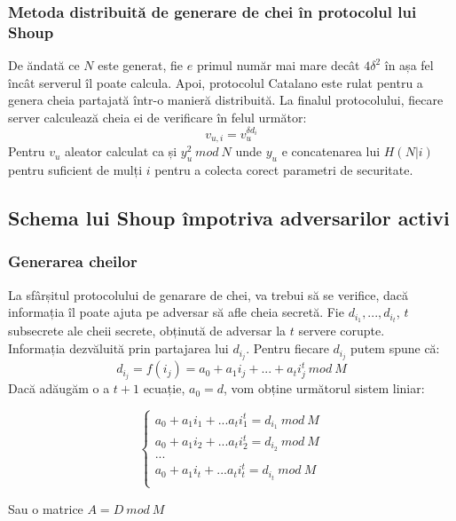 \documentclass[12]{article}
\begin{document}
\subsubsection{Metoda distribuită de generare de chei în protocolul lui Shoup}
De ăndată ce $N$ este generat, fie $e$ primul număr mai mare decât $4 \delta^{2}$  în așa fel încât serverul îl poate calcula. Apoi, protocolul Catalano \cite{catalano} este rulat pentru a genera cheia partajată într-o manieră distribuită. La finalul protocolului, fiecare server calculează cheia ei de verificare în felul următor:
$$ v_{u,i} = v_{u}^{\delta d_i}$$
Pentru $v_u$ aleator calculat ca și $y_{u}^{2} \ mod \ N$ unde $y_u$ e concatenarea lui $H(N|i)$ pentru suficient de mulți $i$ pentru a colecta corect parametri de securitate.

\subsection{Schema lui Shoup împotriva adversarilor activi}
\subsubsection{Generarea cheilor}
La sfârșitul protocolului de genarare de chei, va trebui să se verifice, dacă informația îl poate ajuta pe adversar să afle cheia secretă. Fie $d_{i_1},...,d_{i_t}$, $t$ subsecrete ale cheii secrete, obținută de adversar la $t$ servere corupte. \\
Informația dezvăluită prin partajarea lui $d_{i_j}$. Pentru fiecare $d_{i_j}$ putem spune că: 
$$d_{i_j} = f(i_j) = a_0 + a_1i_j + ... + a_t i_{j}^{t} \ mod \ M       $$
Dacă adăugăm o a $t+1$ ecuație, $a_0=d$, vom obține următorul sistem liniar:



\[
\left\{ 
\begin{array}{c}
a_0 + a_1 i_1 + ... a_t i_{1}^{t}  = d_{i_1} \ mod \ M \\ 
a_0 + a_1 i_2 + ... a_t i_{2}^{t}  = d_{i_2} \ mod \ M \\ 
... \\
a_0 + a_1 i_t + ... a_t i_{t}^{t}  = d_{i_t} \ mod \ M \\
\end{array}
\right. 
\]

Sau o matrice $A = D \ mod \ M$
\end{document}
